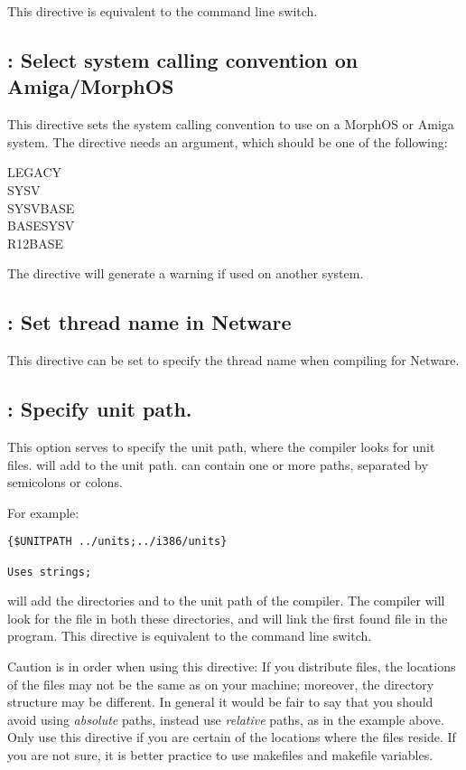 This directive is equivalent to the  command line switch.

\subsection{ : Select system calling convention on Amiga/MorphOS}
This directive sets the system calling convention to use on a MorphOS or
Amiga system. The directive needs an argument, which should be one of the
following:
\begin{description}
\item[LEGACY]
\item[SYSV]
\item[SYSVBASE]
\item[BASESYSV]
\item[R12BASE]
\end{description}
The directive will generate a warning if used on another system.

\subsection{ : Set thread name in Netware}
This directive can be set to specify the thread name when compiling for
Netware. 

\subsection{ : Specify unit path.}

This option serves to specify the unit path, where the compiler looks for
unit files.  will add  to the unit
path.  can contain one or more paths, separated by semicolons or
colons.

For example:
\begin{verbatim}
{$UNITPATH ../units;../i386/units}

Uses strings;
\end{verbatim}

will add the directories  and  to the unit
path of the compiler. The compiler will look for the file 
in both these directories, and will link the first found file in the
program. This directive is equivalent to the  command line switch.

Caution is in order when using this directive: If you distribute files, the
locations of the files may not be the same as on your machine; moreover, the
directory structure may be different. In general it would be fair to say
that you should avoid using {\em absolute} paths, instead use {\em relative}
paths, as in the example above. Only use this directive if you are certain
of the locations where the files reside. If you are not sure, it is better
practice to use makefiles and makefile variables.

